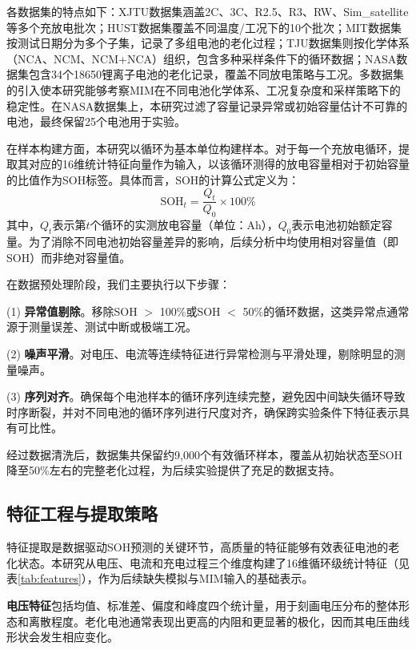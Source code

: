 \documentclass[10pt,a4paper]{ctexart}
\begin{document}
各数据集的特点如下：XJTU数据集涵盖2C、3C、R2.5、R3、RW、Sim\_satellite等多个充放电批次；HUST数据集覆盖不同温度/工况下的10个批次；MIT数据集按测试日期分为多个子集，记录了多组电池的老化过程；TJU数据集则按化学体系（NCA、NCM、NCM+NCA）组织，包含多种采样条件下的循环数据；NASA数据集包含34个18650锂离子电池的老化记录，覆盖不同放电策略与工况。多数据集的引入使本研究能够考察MIM在不同电池化学体系、工况复杂度和采样策略下的稳定性。在NASA数据集上，本研究过滤了容量记录异常或初始容量估计不可靠的电池，最终保留25个电池用于实验。

在样本构建方面，本研究以循环为基本单位构建样本。对于每一个充放电循环，提取其对应的16维统计特征向量作为输入，以该循环测得的放电容量相对于初始容量的比值作为SOH标签。具体而言，SOH的计算公式定义为：
\begin{equation}
    \text{SOH}_t = \frac{Q_t}{Q_0} \times 100\%
\end{equation}
其中，$Q_t$表示第$t$个循环的实测放电容量（单位：Ah），$Q_0$表示电池初始额定容量。为了消除不同电池初始容量差异的影响，后续分析中均使用相对容量值（即SOH）而非绝对容量值。

在数据预处理阶段，我们主要执行以下步骤：

(1) \textbf{异常值剔除}。移除SOH $>$ 100\%或SOH $<$ 50\%的循环数据，这类异常点通常源于测量误差、测试中断或极端工况。

(2) \textbf{噪声平滑}。对电压、电流等连续特征进行异常检测与平滑处理，剔除明显的测量噪声。

(3) \textbf{序列对齐}。确保每个电池样本的循环序列连续完整，避免因中间缺失循环导致时序断裂，并对不同电池的循环序列进行尺度对齐，确保跨实验条件下特征表示具有可比性。

经过数据清洗后，数据集共保留约9,000个有效循环样本，覆盖从初始状态至SOH降至50\%左右的完整老化过程，为后续实验提供了充足的数据支持。

\subsection{特征工程与提取策略}

特征提取是数据驱动SOH预测的关键环节，高质量的特征能够有效表征电池的老化状态\cite{sun2025batteryhealth,wang2022chargingfeatures}。本研究从电压、电流和充电过程三个维度构建了16维循环级统计特征（见表\ref{tab:features}），作为后续缺失模拟与MIM输入的基础表示。

\textbf{电压特征}包括均值、标准差、偏度和峰度四个统计量，用于刻画电压分布的整体形态和离散程度。老化电池通常表现出更高的内阻和更显著的极化，因而其电压曲线形状会发生相应变化。
\end{document}
